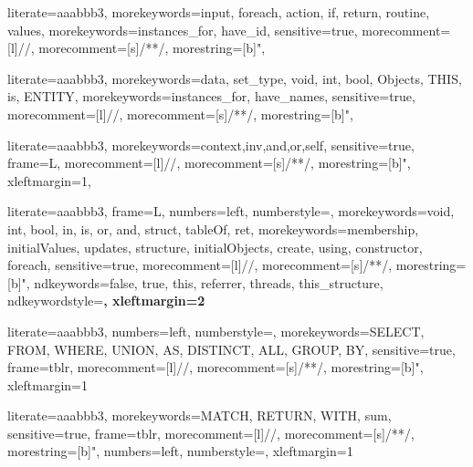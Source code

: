 
{
literate={aaa}{bbb}3,
morekeywords={input, foreach, action, if, return, routine, values},
morekeywords={instances_for, have_id},
sensitive=true,
morecomment=[l]{//},
morecomment=[s]{/*}{*/},
morestring=[b]",
}

{
literate={aaa}{bbb}3,
morekeywords={data, set_type, void, int, bool, Objects, THIS, is, ENTITY},
morekeywords={instances_for, have_names},
sensitive=true,
morecomment=[l]{//},
morecomment=[s]{/*}{*/},
morestring=[b]",
}

{
literate={aaa}{bbb}3,
morekeywords={context,inv,and,or,self},
sensitive=true,
frame=L,
morecomment=[l]{//},
morecomment=[s]{/*}{*/},
morestring=[b]",
xleftmargin=1\parindent,
}

{
literate={aaa}{bbb}3,
frame=L, %
numbers=left,
numberstyle=\color{black}\scriptsize,
morekeywords={void, int, bool, in, is, or, and, struct, tableOf, ret},
morekeywords={membership, initialValues, updates, structure, initialObjects, create, using, constructor, foreach},
sensitive=true,
morecomment=[l]{//},
morecomment=[s]{/*}{*/},
morestring=[b]",
ndkeywords={false, true, this, referrer, threads, this_structure},
ndkeywordstyle=\color{blue}\bfseries,
xleftmargin=2\parindent
}

{
literate={aaa}{bbb}3,
numbers=left,
numberstyle=\color{black}\scriptsize,
morekeywords={SELECT, FROM, WHERE, UNION, AS, DISTINCT, ALL, GROUP, BY},
sensitive=true,
frame=tblr,
morecomment=[l]{//},
morecomment=[s]{/*}{*/},
morestring=[b]",
xleftmargin=1\parindent
}

{
literate={aaa}{bbb}3,
morekeywords={MATCH, RETURN, WITH, sum},
sensitive=true,
frame=tblr,
morecomment=[l]{//},
morecomment=[s]{/*}{*/},
morestring=[b]",
numbers=left,
numberstyle=\color{black}\scriptsize,
xleftmargin=1\parindent
}
